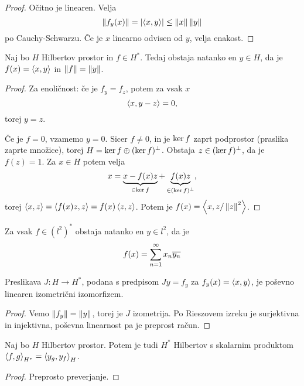 \begin{proof}
  Očitno je linearen.
  Velja
  \[
	\left\lVert f_y(x)\right\rVert = \left| \left< x,y \right> \right| \le \left\lVert x\right\rVert \left\lVert y\right\rVert
  \]
  po Cauchy-Schwarzu.
  Če je $x$ linearno odvisen od $y$, velja enakost.
\end{proof}

\begin{izrek}[Riesz]
  Naj bo $H$ Hilbertov prostor in $f \in H^*$.
  Tedaj obstaja natanko en $y \in H$, da je $f(x) =\left< x,y \right>$ in $\left\lVert f\right\rVert =
  \left\lVert y\right\rVert$.
\end{izrek}

\begin{proof}
  Za enoličnost: če je $f_y = f_z$, potem za vsak $x$
  \[
	\left< x, y-z \right> = 0,
  \]
  torej $y = z$.

  Če je $f = 0$, vzamemo $y = 0$.
  Sicer $f \ne 0$, in je $\operatorname{ker} f$ zaprt podprostor (praslika zaprte množice),
  torej $H = \operatorname{ker} f \oplus (\operatorname{ker} f)^\bot$.
  Obstaja $z \in (\operatorname{ker} f)^\bot$, da je $f(z) = 1$.
  Za $x \in H$ potem velja
  \[
	x = \underbrace{x - f(x) z}_{\in \operatorname{ker} f} + \underbrace{f(x) z}_{\in
	  (\operatorname{ker} f)^\bot},
  \]
  torej $\left< x,z \right> = \left< f(x) z, z \right> = f(x) \left< z,z \right>$.
  Potem je $f(x) = \left< x, z / \left\lVert z\right\rVert^2 \right>$.
\end{proof}


\begin{posledica}
  Za vsak $f \in (l^2)^*$ obstaja natanko en $y \in l^2$, da je
  \[
	f(x) = \sum_{n=1}^\infty x_n \overline{y_n}
  \]
\end{posledica}

\begin{trditev}
  Preslikava $J: H \to H^*$, podana s predpisom $Jy = f_y$ za $f_y(x) =
  \left< x,y \right>$, je poševno linearen izometrični izomorfizem.
\end{trditev}

\begin{proof}
  Vemo $\left\lVert f_y\right\rVert = \left\lVert y\right\rVert$, torej je $J$ izometrija.
  Po Rieszovem izreku je surjektivna in injektivna, poševna linearnost pa je
  preprost račun.
\end{proof}

\begin{izrek}
  Naj bo $H$ Hilbertov prostor.
  Potem je tudi $H^*$ Hilbertov s skalarnim produktom $\left< f,g \right>_{H^*} = \left< y_g,
  y_f \right>_H$.
\end{izrek}

\begin{proof}
  Preprosto preverjanje.
\end{proof}

